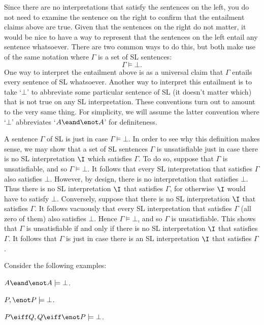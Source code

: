 Since there are no interpretations that satisfy the sentences on the left, you do not need to examine the sentence on the right to confirm that the entailment claims above are true.
Given that the sentences on the right do not matter, it would be nice to have a way to represent that the sentences on the left entail any sentence whatsoever.
There are two common ways to do this, but both make use of the same notation where $\Gamma$ is a set of SL sentences:
$$\Gamma \models \bot.$$
One way to interpret the entailment above is as a universal claim that $\Gamma$ entails every sentence of SL whatsoever. 
Another way to interpret this entailment is to take `$\bot$' to abbreviate some particular sentence of SL (it doesn't matter which) that is not true on any SL interpretation.
These conventions turn out to amount to the very same thing.
For simplicity, we will assume the latter convention where `$\bot$' abbreviates `$A \eand \enot A$' for definiteness.

A sentence $\Gamma$ of SL is  just in case $\Gamma \models \bot$.
In order to see why this definition makes sense, we may show that a set of SL sentences $\Gamma$ is unsatisfiable just in case there is no SL interpretation $\I$ which satisfies $\Gamma$.
To do so, suppose that $\Gamma$ is unsatisfiable, and so $\Gamma \models \bot$.
It follows that every SL interpretation that satisfies $\Gamma$ also satisfies $\bot$.
However, by design, there is no interpretation that satisfies $\bot$.
Thus there is no SL interpretation $\I$ that satisfies $\Gamma$, for otherwise $\I$ would have to satisfy $\bot$.
Conversely, suppose that there is no SL interpretation $\I$ that satisfies $\Gamma$.
It follows vacuously that every SL interpretation that satisfies $\Gamma$ (all zero of them) also satisfies $\bot$.
Hence $\Gamma \models \bot$, and so $\Gamma$ is unsatisfiable.
This shows that $\Gamma$ is unsatisfiable if and only if there is no SL interpretation $\I$ that satisfies $\Gamma$.
It follows that $\Gamma$ is  just in case there is an SL interpretation $\I$ that satisfies $\Gamma$.

Consider the following examples:

\begin{earg}
\item[] $A \eand \enot A \models \bot$.
\item[] $P, \enot P \models \bot$.
\item[] $P \eiff Q, Q \eiff\enot P \models \bot$.
\end{earg}


